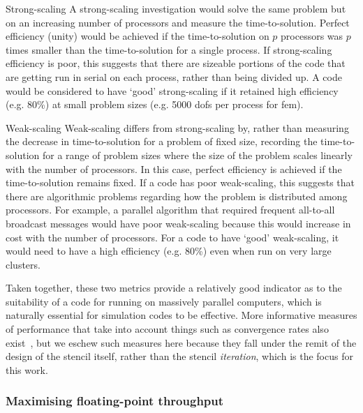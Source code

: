 \begin{paragraph}{Strong-scaling}
A strong-scaling investigation would solve the same problem but on an increasing number of processors and measure the time-to-solution.
Perfect efficiency (unity) would be achieved if the time-to-solution on $p$ processors was $p$ times smaller than the time-to-solution for a single process.
If strong-scaling efficiency is poor, this suggests that there are sizeable portions of the code that are getting run in serial on each process, rather than being divided up.
A code would be considered to have `good' strong-scaling if it retained high efficiency (e.g. 80\%) at small problem sizes (e.g. 5000 \glspl{dof} per process for \gls{fem}).
\end{paragraph}

\begin{paragraph}{Weak-scaling}
Weak-scaling differs from strong-scaling by, rather than measuring the decrease in time-to-solution for a problem of fixed size, recording the time-to-solution for a range of problem sizes where the size of the problem scales linearly with the number of processors.
In this case, perfect efficiency is achieved if the time-to-solution remains fixed.
If a code has poor weak-scaling, this suggests that there are algorithmic problems regarding how the problem is distributed among processors.
For example, a parallel algorithm that required frequent all-to-all broadcast messages would have poor weak-scaling because this would increase in cost with the number of processors.
For a code to have `good' weak-scaling, it would need to have a high efficiency (e.g. 80\%) even when run on very large clusters.
\end{paragraph}

\vspace{1em}

Taken together, these two metrics provide a relatively good indicator as to the suitability of a code for running on massively parallel computers, which is naturally essential for simulation codes to be effective.
More informative measures of performance that take into account things such as convergence rates also exist~\cite{changComparativeStudyFinite2018}, but we eschew such measures here because they fall under the remit of the design of the stencil itself, rather than the stencil \textit{iteration}, which is the focus for this work.

\subsubsection{Maximising floating-point throughput}
\label{sec:background_perf_flops}

